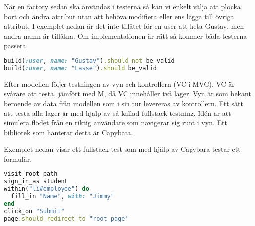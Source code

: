 När en factory sedan ska användas i testerna så kan vi enkelt välja att plocka bort och ändra attribut utan att behöva modifiera eller ens lägga till övriga attribut. I exemplet nedan är det inte tillåtet för en user att heta Gustav, men andra namn är tillåtna. Om implementationen är rätt så kommer båda testerna passera.

\begin{lstlisting}[language=Ruby]
build(:user, name: "Gustav").should_not be_valid
build(:user, name: "Lasse").should be_valid
\end{lstlisting}

Efter modellen följer testningen av vyn och kontrollern (VC i MVC). VC är svårare att testa, jämfört med M, då VC innehåller två lager. Vyn är som bekant beroende av data från modellen som i sin tur levereras av kontrollern. Ett sätt att testa alla lager är med hjälp av så kallad fullstack-testning. Idén är att simulera flödet från en riktig användare som navigerar sig runt i vyn. Ett bibliotek som hanterar detta är Capybara.

Exemplet nedan visar ett fullstack-test som med hjälp av Capybara testar ett formulär.

\begin{lstlisting}[language=Ruby]
visit root_path
sign_in_as student
within("li#employee") do
  fill_in "Name", with: "Jimmy"
end
click_on "Submit"
page.should_redirect_to "root_page"
\end{lstlisting}
